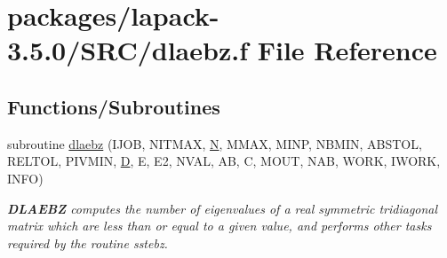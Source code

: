 \hypertarget{dlaebz_8f}{}\section{packages/lapack-\/3.5.0/\+S\+R\+C/dlaebz.f File Reference}
\label{dlaebz_8f}
\subsection*{Functions/\+Subroutines}
\begin{DoxyCompactItemize}
\item 
subroutine \hyperlink{group__auxOTHERauxiliary_ga79da86f5a84d0038788717338eef245d}{dlaebz} (I\+J\+O\+B, N\+I\+T\+M\+A\+X, \hyperlink{polmisc_8c_a0240ac851181b84ac374872dc5434ee4}{N}, M\+M\+A\+X, M\+I\+N\+P, N\+B\+M\+I\+N, A\+B\+S\+T\+O\+L, R\+E\+L\+T\+O\+L, P\+I\+V\+M\+I\+N, \hyperlink{odrpack_8h_a7dae6ea403d00f3687f24a874e67d139}{D}, E, E2, N\+V\+A\+L, A\+B, C, M\+O\+U\+T, N\+A\+B, W\+O\+R\+K, I\+W\+O\+R\+K, I\+N\+F\+O)
\begin{DoxyCompactList}\small\item\em {\bfseries D\+L\+A\+E\+B\+Z} computes the number of eigenvalues of a real symmetric tridiagonal matrix which are less than or equal to a given value, and performs other tasks required by the routine sstebz. \end{DoxyCompactList}\end{DoxyCompactItemize}
